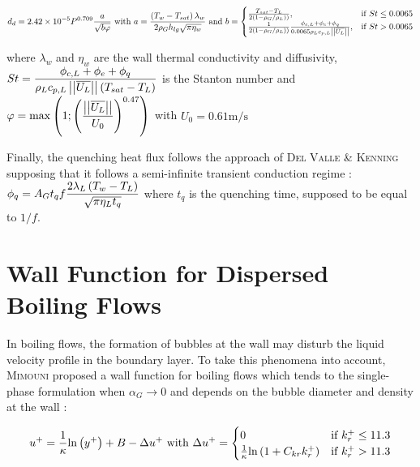 \begin{equation}
\label{eq:unal}
d_{d}=2.42\times 10^{-5} P^{0.709} \frac{a}{\sqrt{b\varphi}}\text{ with } a=\frac{\parth{T_{w}-T_{sat}} \lambda_{w}}{2\rho_{G}h_{lg}\sqrt{\pi\eta_{w}}} \text{ and } 
  b=\begin{cases}
    \frac{T_{sat}-T_{L}}{2 \parth{1-\rho_{G}/\rho_{L} })}, & \text{if $St\leq0.0065$}\\
    \frac{1}{2 \parth{1-\rho_{G}/\rho_{L} })}\frac{\phi_{c,L}+\phi_{e}+\phi_{q}}{0.0065\rho_{L}c_{p,L}\norm{\vect{U_{L}}}}, & \text{\text{if $St>0.0065$}}
  \end{cases}
\end{equation}

where $\lambda_{w}$ and $\eta_{w}$ are the wall thermal conductivity and diffusivity, $St=\displaystyle \frac{\phi_{c,L}+\phi_{e}+\phi_{q}}{\rho_{L}c_{p,L}\left|\left|{\overline{U_{L}}}\right|\right|\left( T_{sat}-T_{L}  \right)}$ is the Stanton number and $\varphi=\displaystyle \mathrm{max}\left( 1 ; \left( \frac{\left|\left|{\overline{U_{L}}}\right|\right|}{U_{0}}  \right)^{0.47}  \right)$ with $U_{0}=0.61\text{m/s}$

Finally, the quenching heat flux follows the approach of \textsc{Del Valle} \& \textsc{Kenning}\cite{delvalle1985} supposing that it follows a semi-infinite transient conduction regime : $\displaystyle \phi_{q}=A_{G}t_{q}f\frac{2\lambda_{L} \left( T_{w}-T_{L} \right)}{\sqrt{\pi \eta_{L}t_{q}}}$ where $t_{q}$ is the quenching time, supposed to be equal to $1/f$.

\section{Wall Function for Dispersed Boiling Flows}
\label{subsec:wall_func}

In boiling flows, the formation of bubbles at the wall may disturb the liquid velocity profile in the boundary layer. To take this phenomena into account, \textsc{Mimouni} \etal\cite{mimouni2016} proposed a wall function for boiling flows which tends to the single-phase formulation when $\alpha_{G} \rightarrow 0$ and depends on the bubble diameter and density at the wall : 

\begin{equation}
\label{eq:wall_law}
u^{+}=\frac{1}{\kappa}\ln{ y^{+} } + B - \Delta u^{+} \text{ with } 
  \Delta u^{+}=\begin{cases}
    0 & \text{if $k_{r}^{+}\leq11.3$}\\
    \frac{1}{\kappa}\ln{ 1+ C_{kr}k_{r}^{+} } & \text{\text{if $k_{r}^{+}>11.3$}}
  \end{cases}
\end{equation}

